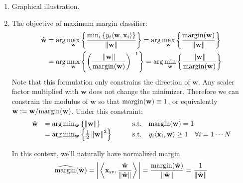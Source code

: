 \documentclass[a4paper, 10pt]{article}
\newcommand{\annot}[1]{{\rm #1}}
\begin{document}
\begin{enumerate}[label=(\alph*)]
    \item Graphical illustration.
    \item The objective of maximum margin classifier:
    \begin{equation}
        \begin{aligned}
            \hat{\mathbf{w}} &= \arg\max_{\mathbf{w}} \left\{ \frac{\min_i \left\{ y_i \langle \mathbf{w}, \mathbf{x}_i \rangle \right\}} {\left\|\mathbf{w}\right\|} \right\}
            = \arg \max_{\mathbf{w}} \left\{ \frac{\annot{margin}(\mathbf{w})}{\left\|\mathbf{w}\right\|} \right\} \\ 
            &= \arg \max_{\mathbf{w}} \left\{ \left(\frac{\left\|\mathbf{w}\right\|}{\annot{margin}(\mathbf{w})}\right)^{-1} \right\} = \arg \min_{\mathbf{w}} \left\{ \frac{\left\|\mathbf{w}\right\|}{\annot{margin}(\mathbf{w})} \right\}
        \end{aligned}
    \end{equation}
    Note that this formulation only constrains the direction of $\mathbf{w}$. Any scaler factor multiplied with $\mathbf{w}$ does not change the minimizer. Therefore we can constrain the modulus of $\mathbf{w}$ so that $\annot{margin}(\mathbf{w}) \equiv 1$, or equivalently $\mathbf{w} := \mathbf{w}/\annot{margin}(\mathbf{w})$. Under this constraint:
    \begin{equation}
        \begin{array}{rll}\displaystyle
            \hat{\mathbf{w}} &= \arg \min_{\mathbf{w}} \left\{ \left\| \mathbf{w} \right\| \right\}\qquad & \annot{s.t.}\quad \annot{margin}(\mathbf{w}) = 1\\
            &= \arg \min_{\mathbf{w}} \left\{ \frac{1}{2} \left\| \mathbf{w} \right\|^2 \right\}\qquad &\annot{s.t.}\quad y_i \langle \mathbf{x}_i, \mathbf{w} \rangle \geq 1\quad \forall i=1\cdots N
        \end{array}
    \end{equation}
    
    In this context, we'll naturally have normalized margin
    \begin{equation}
        \widehat{\annot{margin}}(\hat{\mathbf{w}}) = \bigg| \left\langle \mathbf{x}_\annot{sv}, \frac{\hat{\mathbf{w}}}{\left\|\hat{\mathbf{w}}\right\|} \right\rangle \bigg| = \frac{\annot{margin}(\hat{\mathbf{w}})}{\left\| \hat{\mathbf{w}} \right\|} = \frac{1}{\left\| \hat{\mathbf{w}} \right\|}
    \end{equation}
    
\end{enumerate}
\end{document}
